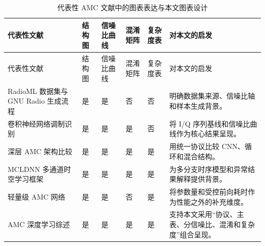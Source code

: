 \begingroup
\footnotesize
\setlength{\tabcolsep}{3pt}
\renewcommand{\arraystretch}{1.15}
\begin{longtable}{p{}>{\centering\arraybackslash}p{}>{\centering\arraybackslash}p{}>{\centering\arraybackslash}p{}>{\centering\arraybackslash}p{}p{}}
\caption{代表性 AMC 文献中的图表表达与本文图表设计}\label{tab:literature-figure-patterns}\\
\toprule
代表性文献 & 结构图 & 信噪比曲线 & 混淆矩阵 & 复杂度表 & 对本文的启发 \\
\midrule
\endfirsthead
\toprule
代表性文献 & 结构图 & 信噪比曲线 & 混淆矩阵 & 复杂度表 & 对本文的启发 \\
\midrule
\endhead
RadioML 数据集与 GNU Radio 生成流程\cite{oshea2016radioml} & 是 & 是 & 否 & 否 & 明确数据集来源、信噪比轴和样本生成背景。 \\
卷积神经网络调制识别\cite{oshea2016cnn} & 是 & 是 & 是 & 否 & 将 I/Q 序列基线和信噪比曲线作为核心结果呈现。 \\
深层 AMC 架构比较\cite{west2017deep} & 是 & 是 & 是 & 是 & 用统一协议比较 CNN、循环和混合结构。 \\
MCLDNN 多通道时空学习框架\cite{xu2020mcldnn} & 是 & 是 & 是 & 是 & 为多分支时序模型和异常结果解释提供背景。 \\
轻量级 AMC 网络\cite{wang2021lwamcnet} & 是 & 是 & 否 & 是 & 将参数量和受控前向耗时作为性能之外的补充维度。 \\
AMC 深度学习综述\cite{huynhthe2021survey} & 是 & 是 & 是 & 是 & 支持本文采用“协议、主表、分信噪比、混淆和复杂度”组合呈现。 \\
\bottomrule
\end{longtable}
\endgroup
